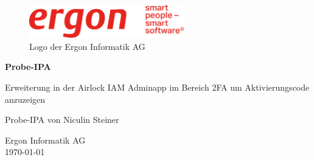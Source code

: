 \begin{titlepage}

    \begin{figure}
        \begin{center}
            \includegraphics[width=0.6\textwidth]{ressourcen/ergon_logo_gross}
            \captionsetup{textformat=empty, labelformat=empty}
            \caption[Logo der Ergon Informatik AG]{Logo der Ergon Informatik AG}\label{fig:ergon-logo-gross}
        \end{center}\nocite{ergonlogo}
    \end{figure}
    \begin{center}
        \vspace*{2cm}
        \Huge
        \textbf{Probe-IPA}

        \vspace{0.5cm}
        \Large

Erweiterung in der Airlock IAM Adminapp im Bereich 2FA um Aktivierungscode anzuzeigen

        \vfill

        \Large
        Probe-IPA von Niculin Steiner

        \vspace*{3cm}

        \large
        Ergon Informatik AG\\
        \today\\

    \end{center}
\end{titlepage}
